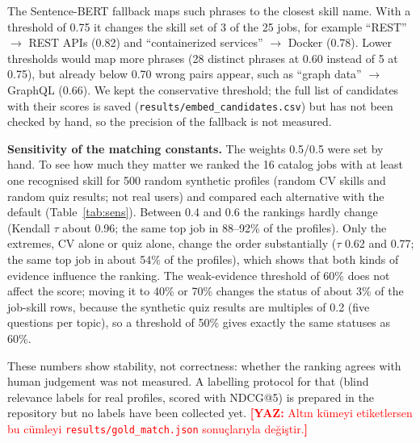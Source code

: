 \documentclass[runningheads]{llncs}
\newcommand{\yaz}[1]{\textcolor{red}{\textbf{[YAZ:} #1\textbf{]}}}
\begin{document}
The Sentence-BERT fallback \cite{reimers2019sbert} maps such phrases to the closest skill name. With a
threshold of 0.75 it changes the skill set of 3 of the 25 jobs, for example ``REST'' $\rightarrow$ REST
APIs (0.82) and ``containerized services'' $\rightarrow$ Docker (0.78). Lower thresholds would map
more phrases (28 distinct phrases at 0.60 instead of 5 at 0.75), but already below 0.70 wrong pairs
appear, such as ``graph data'' $\rightarrow$ GraphQL (0.66). We kept the conservative threshold; the
full list of candidates with their scores is saved (\texttt{results/embed\_candidates.csv}) but has not
been checked by hand, so the precision of the fallback is not measured.

\begin{table}[t]
\centering
\caption{Ranking stability for other CV/quiz weights, against the default 0.5/0.5, over 500 random
synthetic profiles (not real users) and the catalog jobs with at least one recognised skill
(\texttt{scripts/sensitivity.py}).}
\label{tab:sens}

\end{table}

\textbf{Sensitivity of the matching constants.} The weights 0.5/0.5 were set by hand. To see how much
they matter we ranked the 16 catalog jobs with at least one recognised skill for 500 random synthetic
profiles (random CV skills and random quiz results; not real users) and compared each alternative with
the default (Table~\ref{tab:sens}). Between 0.4 and 0.6 the rankings hardly change (Kendall $\tau$ about
0.96; the same top job in 88--92\% of the profiles). Only the extremes, CV alone or quiz alone, change
the order substantially ($\tau$ 0.62 and 0.77; the same top job in about 54\% of the profiles), which
shows that both kinds of evidence influence the ranking. The weak-evidence threshold of 60\% does not
affect the score; moving it to 40\% or 70\% changes the status of about 3\% of the job-skill rows,
because the synthetic quiz results are multiples of 0.2 (five questions per topic), so a threshold of
50\% gives exactly the same statuses as 60\%.

These numbers show stability, not correctness: whether the ranking agrees with human judgement was not
measured. A labelling protocol for that (blind relevance labels for real profiles, scored with NDCG@5)
is prepared in the repository but no labels have been collected yet. \yaz{Altın kümeyi etiketlersen
bu cümleyi \texttt{results/gold\_match.json} sonuçlarıyla değiştir.}
\end{document}
